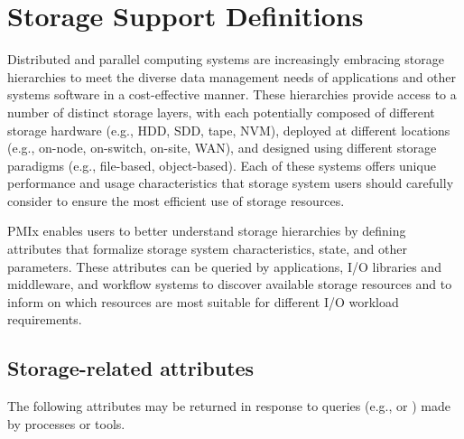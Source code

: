 \chapter{Storage Support Definitions}
\label{chap:api_storage}

Distributed and parallel computing systems are increasingly embracing storage hierarchies to meet the diverse data management needs of applications and other systems software in a cost-effective manner.
These hierarchies provide access to a number of distinct storage layers, with each potentially composed of different storage hardware (e.g., HDD, SDD, tape, NVM), deployed at different locations (e.g., on-node, on-switch, on-site, WAN), and designed using different storage paradigms (e.g., file-based, object-based).
Each of these systems offers unique performance and usage characteristics that storage system users should carefully consider to ensure the most efficient use of storage resources.

PMIx enables users to better understand storage hierarchies by defining attributes that formalize storage system characteristics, state, and other parameters.
These attributes can be queried by applications, I/O libraries and middleware, and workflow systems to discover available storage resources and to inform on which resources are most suitable for different I/O workload requirements.


\section{Storage-related attributes}
\label{api:struct:attributes:pstrg}


The following attributes may be returned in response to queries (e.g.,  or ) made by processes or tools.

%

%

%

